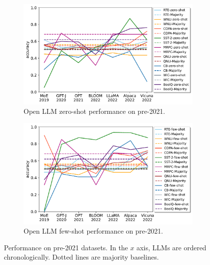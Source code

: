 \documentclass[letterpaper]{article} %
\newcommand{\jmf}[1]{}      %
\newcommand{\jmfb}[1]{}      %
\begin{document}
\begin{figure}[t]
\begin{subfigure}[b]{0.45\textwidth}
            \includegraphics[scale=0.38]{img/output-zero-shot-old-dataset-recent-llm.pdf}
            \caption[]%
            {{Open LLM zero-shot performance on pre-2021.\jmfb{My guess is OPT probably does better than davinci because of the weighting of the datasets during training}}}    
            \label{fig:Zero shot performance for old datasets}
        \end{subfigure}
        \hfill
        \begin{subfigure}[b]{0.45\textwidth}   
            \centering 
            \includegraphics[scale=0.38]{img/output-few-shot-old-dataset-recent-llm.pdf}
            \caption[]%
            {Open LLM few-shot performance on pre-2021. \jmf{five shots}\jmfb{why does is it so good on sst? I think because it's true few shot learning }}    
            \label{fig:Few shot performance for old datasets}
        \end{subfigure}
        \caption[]
        {Performance on pre-2021 datasets. In the $x$ axis, LLMs are ordered chronologically. Dotted lines are majority baselines.} 
        \label{fig:experiments-zero-shot}
    \end{figure}
\end{document}
